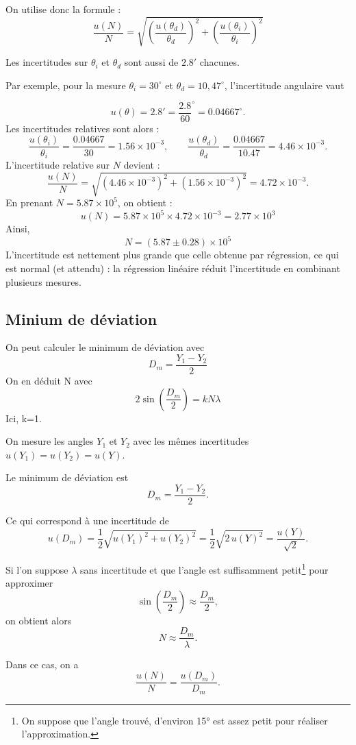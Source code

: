 \documentclass[a4paper,10pt,french]{scrartcl}
\begin{document}
On utilise donc la formule : \[\frac{u(N)}{N} = \sqrt{(\frac{u(\theta_d)}{\theta_d})^2 + (\frac{u(\theta_i)}{\theta_i})^2}\]

Les incertitudes sur \(\theta_i\) et \(\theta_d\) sont aussi de \(2.8'\) chacunes.


Par exemple, pour la mesure $\theta_i = 30^\circ$ et $\theta_d = 10{,}47^\circ$, l'incertitude angulaire vaut

\[
u(\theta) = 2.8' = \frac{2.8}{60}^\circ = 0.04667^\circ.
\]
Les incertitudes relatives sont alors :
\[
\frac{u(\theta_i)}{\theta_i} = \frac{0.04667}{30} = 1.56\times 10^{-3}, \qquad
\frac{u(\theta_d)}{\theta_d} = \frac{0.04667}{10.47} = 4.46\times 10^{-3}.
\]
L'incertitude relative sur $N$ devient :
\[
\frac{u(N)}{N}
= \sqrt{(4.46\times 10^{-3})^2 + (1.56\times 10^{-3})^2}
= 4.72\times 10^{-3}.
\]
En prenant $N = 5.87\times 10^{5}$, on obtient :
\[
u(N) = 5.87\times 10^{5} \times 4.72\times 10^{-3}
      = 2.77\times 10^{3}
\]
Ainsi,
\[
N = (5.87 \pm 0.28)\times 10^{5}
\]
L'incertitude est nettement plus grande que celle obtenue par régression, ce qui est normal (et attendu) : la régression linéaire réduit l’incertitude en combinant plusieurs mesures.
\subsection{Minium de déviation}
On peut calculer le minimum de déviation avec
\begin{equation}
 D_m = \frac{Y_1-Y_2}{2}
\end{equation}
On en déduit N avec
\begin{equation}
 2\sin(\frac{D_m}{2}) = kN\lambda
\end{equation}
Ici, k=1.

On mesure les angles $Y_1$ et $Y_2$ avec les mêmes incertitudes $u(Y_1) = u(Y_2) = u(Y)$.

Le minimum de déviation est
\[
D_m = \frac{Y_1 - Y_2}{2}.
\]

Ce qui correspond à une incertitude de
\[
u(D_m) = \frac{1}{2}\sqrt{u(Y_1)^2 + u(Y_2)^2}
       = \frac{1}{2}\sqrt{2\,u(Y)^2}
       = \frac{u(Y)}{\sqrt{2}}.
\]

Si l’on suppose $\lambda$ sans incertitude et que l’angle est suffisamment petit\footnote{On suppose que l'angle trouvé, d'environ 15° est assez petit pour réaliser l'approximation.} pour approximer
\[
\sin\left(\frac{D_m}{2}\right) \approx \frac{D_m}{2},
\]
on obtient alors
\[
N \approx \frac{D_m}{\lambda}.
\]

Dans ce cas, on a
\[
\frac{u(N)}{N} = \frac{u(D_m)}{D_m}.
\]
\end{document}
